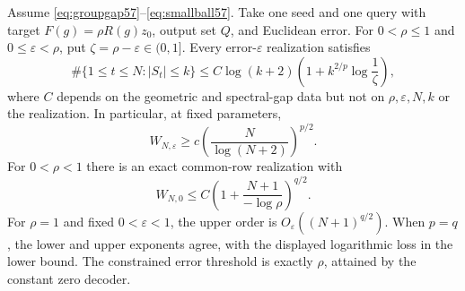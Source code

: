 \begin{theorem}\label{thm:uniformorbit57}
Assume \eqref{eq:groupgap57}--\eqref{eq:smallball57}. Take one seed and one query with target $F(g)=\rho R(g)z_0$, output set $Q$, and Euclidean error. For $0<\rho\le1$ and $0\le\varepsilon<\rho$, put $\zeta=\rho-\varepsilon\in(0,1]$. Every error-$\varepsilon$ realization satisfies
\begin{equation}\label{eq:orbitoccupation57}
 \#\{1\le t\le N:|S_t|\le k\}
 \le C\log(k+2)\left(1+k^{2/p}\log\frac1\zeta\right),
\end{equation}
where $C$ depends on the geometric and spectral-gap data but not on $\rho,\varepsilon,N,k$ or the realization. In particular, at fixed parameters,
\begin{equation}\label{eq:orbitrates57}
 W_{N,\varepsilon}\ge c\left(\frac{N}{\log(N+2)}\right)^{p/2}.
\end{equation}
For $0<\rho<1$ there is an exact common-row realization with
\begin{equation}\label{eq:orbitupper57}
 W_{N,0}\le C\left(1+\frac{N+1}{-\log\rho}\right)^{q/2}.
\end{equation}
For $\rho=1$ and fixed $0<\varepsilon<1$, the upper order is $O_\varepsilon((N+1)^{q/2})$. When $p=q$, the lower and upper exponents agree, with the displayed logarithmic loss in the lower bound. The constrained error threshold is exactly $\rho$, attained by the constant zero decoder.
\end{theorem}
